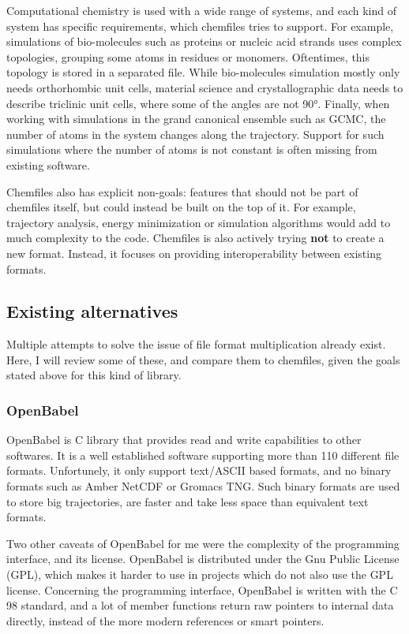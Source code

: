 \documentclass[thesis]{subfiles}
\def\cxx{{C\nolinebreak[4]\hspace{-.05em}\raisebox{.3ex}{\footnotesize ++}}\xspace}
\begin{document}
Computational chemistry is used with a wide range of systems, and each kind of
system has specific requirements, which chemfiles tries to support. For
example, simulations of bio-molecules such as proteins or nucleic acid strands
uses complex topologies, grouping some atoms in residues or monomers.
Oftentimes, this topology is stored in a separated file. While bio-molecules
simulation mostly only needs orthorhombic unit cells, material science and
crystallographic data needs to describe triclinic unit cells, where some of the
angles are not 90°. Finally, when working with simulations in the grand
canonical ensemble such as GCMC, the number of atoms in the system changes along
the trajectory. Support for such simulations where the number of atoms is not
constant is often missing from existing software.

Chemfiles also has explicit non-goals: features that should not be part of
chemfiles itself, but could instead be built on the top of it. For example,
trajectory analysis, energy minimization or simulation algorithms would add to
much complexity to the code. Chemfiles is also actively trying \textbf{not} to
create a new format. Instead, it focuses on providing interoperability between
existing formats.

\subsection{Existing alternatives}

Multiple attempts to solve the issue of file format multiplication already
exist. Here, I will review some of these, and compare them to chemfiles,
given the goals stated above for this kind of library.

\subsubsection{OpenBabel}

OpenBabel\cite{OBoyle2011} is \cxx library that provides read and write
capabilities to other softwares. It is a well established software supporting
more than 110 different file formats. Unfortunely, it only support text/ASCII
based formats, and no binary formats such as Amber NetCDF or Gromacs TNG. Such
binary formats are used to store big trajectories, are faster and take less
space than equivalent text formats.

Two other caveats of OpenBabel for me were the complexity of the programming
interface, and its license. OpenBabel is distributed under the Gnu Public
License (GPL), which makes it harder to use in projects which do not also use
the GPL license. Concerning the programming interface, OpenBabel is written with
the \cxx 98 standard, and a lot of member functions return raw pointers to
internal data directly, instead of the more modern references or smart pointers.
\end{document}
